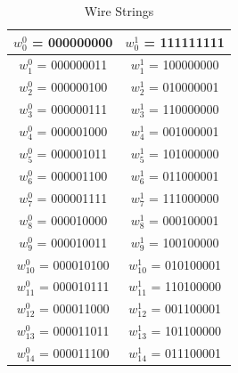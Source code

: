 \documentclass[times]{article}
\begin{document}
	\begin{table}
		\centering
		\caption{Wire Strings}
		\label{tab:wire}
		\begin{tabular}{| c | c |}
			\hline
			$w_0^0$ = 000000000 & $w_0^1$ = 111111111 \\
			\hline
			$w_1^0$ = 000000011 & $w_1^1$ = 100000000 \\
			\hline
			$w_2^0$ = 000000100 & $w_2^1$ = 010000001 \\
			\hline
			$w_3^0$ = 000000111 & $w_3^1$ = 110000000 \\
			\hline
			$w_4^0$ = 000001000 & $w_4^1$ = 001000001 \\
			\hline
			$w_5^0$ = 000001011 & $w_5^1$ = 101000000 \\
			\hline
			$w_6^0$ = 000001100 & $w_6^1$ = 011000001 \\
			\hline
			$w_7^0$ = 000001111 & $w_7^1$ = 111000000 \\
			\hline
			$w_8^0$ = 000010000 & $w_8^1$ = 000100001 \\
			\hline
			$w_9^0$ = 000010011 & $w_9^1$ = 100100000 \\
			\hline
			$w_{10}^0$ = 000010100 & $w_{10}^1$ = 010100001 \\
			\hline
			$w_{11}^0$ = 000010111 & $w_{11}^1$ = 110100000 \\
			\hline
			$w_{12}^0$ = 000011000 & $w_{12}^1$ = 001100001 \\
			\hline
			$w_{13}^0$ = 000011011 & $w_{13}^1$ = 101100000 \\
			\hline
			$w_{14}^0$ = 000011100 & $w_{14}^1$ = 011100001 \\
			\hline
		\end{tabular}
	\end{table}
\end{document}
